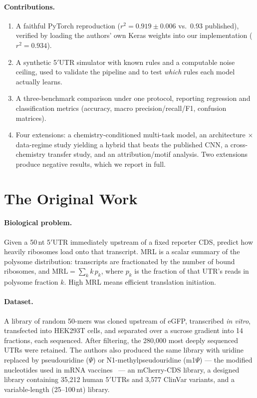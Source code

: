 \documentclass{article}
\begin{document}
\paragraph{Contributions.}
\begin{enumerate}\itemsep2pt
\item A faithful PyTorch reproduction ($r^2=0.919\pm0.006$ vs.\ 0.93 published), verified by
loading the authors' own Keras weights into our implementation ($r^2=0.934$).
\item A synthetic 5$'$UTR simulator with known rules and a computable noise ceiling, used to
validate the pipeline and to test \emph{which} rules each model actually learns.
\item A three-benchmark comparison under one protocol, reporting regression and
classification metrics (accuracy, macro precision/recall/F1, confusion matrices).
\item Four extensions: a chemistry-conditioned multi-task model, an architecture $\times$
data-regime study yielding a hybrid that beats the published CNN, a cross-chemistry transfer
study, and an attribution/motif analysis. Two extensions produce negative results, which we
report in full.
\end{enumerate}

\section{The Original Work}
\label{sec:paper}

\paragraph{Biological problem.} Given a 50\,nt 5$'$UTR immediately upstream of a fixed
reporter CDS, predict how heavily ribosomes load onto that transcript. MRL is a scalar
summary of the polysome distribution: transcripts are fractionated by the number of bound
ribosomes, and
$\mathrm{MRL} = \sum_{k} k \, p_k$,
where $p_k$ is the fraction of that UTR's reads in polysome fraction $k$. High MRL means
efficient translation initiation.

\paragraph{Dataset.} A library of random 50-mers was cloned upstream of eGFP, transcribed
\emph{in vitro}, transfected into HEK293T cells, and separated over a sucrose gradient into
14 fractions, each sequenced. After filtering, the 280{,}000 most deeply sequenced UTRs were
retained. The authors also produced the same library with uridine replaced by pseudouridine
($\Psi$) or N1-methylpseudouridine (m1$\Psi$) --- the modified nucleotides used in mRNA
vaccines~\citep{kariko2008} --- an mCherry-CDS library, a designed library containing 35{,}212 human 5$'$UTRs
and 3{,}577 ClinVar variants, and a variable-length (25--100\,nt) library.
\end{document}

